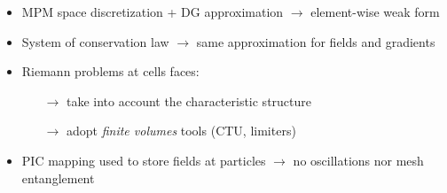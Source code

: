 \documentclass[11pt,aspectratio=169]{beamer}
\begin{document}
\begin{frame}[standout]%
  \vskip 5pt
  \begin{scriptsize}
      
  
    \begin{overprint}
      \begin{block}{}
      \vskip -6pt
        \begin{itemize}
        \item MPM space discretization + DG approximation $\rightarrow$ element-wise weak form
        \item System of conservation law $\rightarrow$ same approximation for fields and gradients
        \item Riemann problems at cells faces:
          \begin{itemize}
          \item[$\rightarrow$] \scriptsize take into account the characteristic structure 
          \item[$\rightarrow$] \scriptsize adopt \textit{finite volumes} tools (CTU, limiters) 
          \end{itemize}
        \item PIC mapping used to store fields at particles $\rightarrow$ no oscillations nor mesh entanglement
        \end{itemize}
      \end{block}
    

\end{overprint}
\end{scriptsize}
\end{frame}
\end{document}
